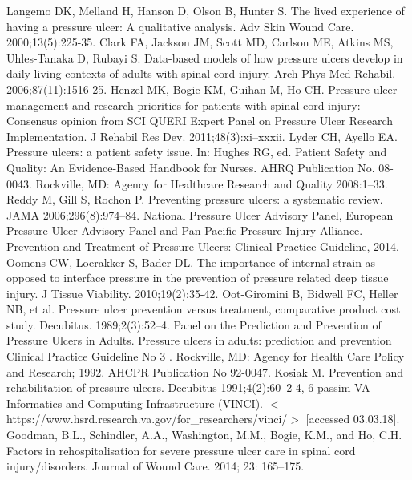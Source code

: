 \documentclass{amia}
\begin{document}
{\footnotesize

\begin{thebibliography}{1}
\setlength\itemsep{-0.1em}

Langemo DK, Melland H, Hanson D, Olson B, Hunter S. The lived experience of having a pressure ulcer: A qualitative analysis. Adv Skin Wound Care. 2000;13(5):225-35.
Clark FA, Jackson JM, Scott MD, Carlson ME, Atkins MS, Uhles-Tanaka D, Rubayi S. Data-based models of how pressure ulcers develop in daily-living contexts of adults with spinal cord injury. Arch Phys Med Rehabil. 2006;87(11):1516-25.
Henzel MK, Bogie KM, Guihan M, Ho CH. Pressure ulcer management and research priorities for patients with spinal cord injury: Consensus opinion from SCI QUERI Expert Panel on Pressure Ulcer Research Implementation. J Rehabil Res Dev. 2011;48(3):xi–xxxii.
Lyder CH, Ayello EA. Pressure ulcers: a patient safety issue. In: Hughes RG, ed. Patient Safety and Quality: An Evidence-Based Handbook for Nurses. AHRQ Publication No. 08-0043. Rockville, MD: Agency for Healthcare Research and Quality 2008:1–33.
Reddy M, Gill S, Rochon P. Preventing pressure ulcers: a systematic review. JAMA 2006;296(8):974–84.
National Pressure Ulcer Advisory Panel, European Pressure Ulcer Advisory Panel and Pan Pacific Pressure Injury Alliance. Prevention and Treatment of Pressure Ulcers: Clinical Practice Guideline, 2014.
Oomens CW, Loerakker S, Bader DL. The importance of internal strain as opposed to interface pressure in the prevention of pressure related deep tissue injury. J Tissue Viability. 2010;19(2):35-42.
Oot-Giromini B, Bidwell FC, Heller NB, et al. Pressure ulcer prevention versus treatment, comparative product cost study. Decubitus. 1989;2(3):52–4.
Panel on the Prediction and Prevention of Pressure Ulcers in Adults. Pressure ulcers in adults: prediction and prevention Clinical Practice Guideline No 3 . Rockville, MD: Agency for Health Care Policy and Research; 1992. AHCPR Publication No 92-0047.
Kosiak M. Prevention and rehabilitation of pressure ulcers. Decubitus 1991;4(2):60–2 4, 6 passim
VA Informatics and Computing Infrastructure (VINCI). $<$https://www.hsrd.research.va.gov/for\_researchers/vinci/$>$ [accessed 03.03.18].
Goodman, B.L., Schindler, A.A., Washington, M.M., Bogie, K.M., and Ho, C.H. Factors in rehospitalisation for severe pressure ulcer care in spinal cord injury/disorders. Journal of Wound Care. 2014; 23: 165–175.

\end{thebibliography}}
\end{document}
